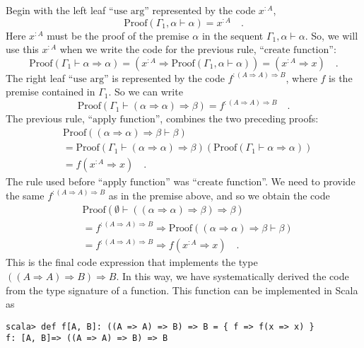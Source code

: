 Begin with the left leaf ``$\text{use arg}$'' represented by the
code $x^{:A}$,
\[
\text{Proof}\left(\Gamma_{1},\alpha\vdash\alpha\right)=x^{:A}\quad.
\]
Here $x^{:A}$ must be the proof of the premise $\alpha$ in the sequent
$\Gamma_{1},\alpha\vdash\alpha$. So, we will use this $x^{:A}$ when
we write the code for the previous rule, ``$\text{create function}$'':
\[
\text{Proof}\left(\Gamma_{1}\vdash\alpha\Rightarrow\alpha\right)=(x^{:A}\Rightarrow\text{Proof}\left(\Gamma_{1},\alpha\vdash\alpha\right))=(x^{:A}\Rightarrow x)\quad.
\]
The right leaf ``$\text{use arg}$'' is represented by the code
$f^{:(A\Rightarrow A)\Rightarrow B}$, where $f$ is the premise contained
in $\Gamma_{1}$. So we can write
\[
\text{Proof}\left(\Gamma_{1}\vdash(\alpha\Rightarrow\alpha)\Rightarrow\beta\right)=f^{:(A\Rightarrow A)\Rightarrow B}\quad.
\]
The previous rule, ``$\text{apply function}$'', combines the two
preceding proofs:
\begin{align*}
 & \text{Proof}\left((\alpha\Rightarrow\alpha)\Rightarrow\beta\vdash\beta\right)\\
 & =\text{Proof}(\Gamma_{1}\vdash(\alpha\Rightarrow\alpha)\Rightarrow\beta)\left(\text{Proof}(\Gamma_{1}\vdash\alpha\Rightarrow\alpha)\right)\\
 & =f(x^{:A}\Rightarrow x)\quad.
\end{align*}
The rule used before ``$\text{apply function}$'' was ``$\text{create function}$''.
We need to provide the same $f^{:\left(A\Rightarrow A\right)\Rightarrow B}$
as in the premise above, and so we obtain the code
\begin{align*}
 & \text{Proof}\left(\emptyset\vdash((\alpha\Rightarrow\alpha)\Rightarrow\beta)\Rightarrow\beta\right)\\
 & =f^{:\left(A\Rightarrow A\right)\Rightarrow B}\Rightarrow\text{Proof}\left((\alpha\Rightarrow\alpha)\Rightarrow\beta\vdash\beta\right)\\
 & =f^{:\left(A\Rightarrow A\right)\Rightarrow B}\Rightarrow f(x^{:A}\Rightarrow x)\quad.
\end{align*}
This is the final code expression that implements the type $(\left(A\Rightarrow A\right)\Rightarrow B)\Rightarrow B$.
In this way, we have systematically derived the code from the type
signature of a function. This function can be implemented in Scala
as
\begin{lstlisting}
scala> def f[A, B]: ((A => A) => B) => B = { f => f(x => x) }
f: [A, B]=> ((A => A) => B) => B
\end{lstlisting}
